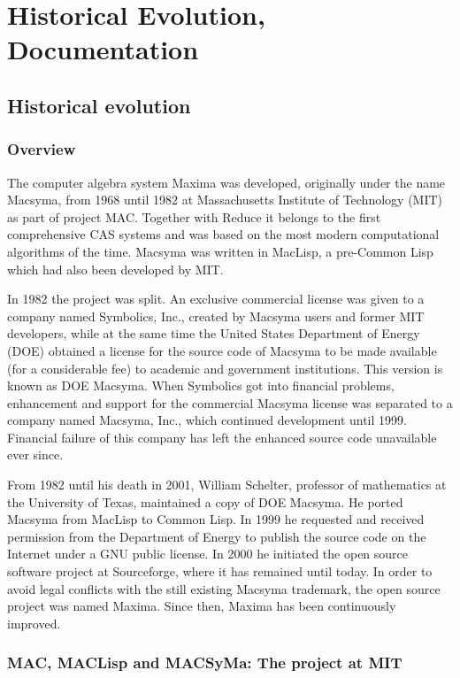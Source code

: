 \documentclass[../Maxima_Workbook.tex]{subfiles}
\begin{document}
	
\part{Historical Evolution, Documentation}

\chapter{Historical evolution}

\section{Overview}

The computer algebra system Maxima was developed, originally under the name Macsyma, from 1968 until 1982 at Massachusetts Institute of Technology (MIT) as part of project MAC. Together with Reduce it belongs to the first comprehensive CAS systems and was based on the most modern computational algorithms of the time. Macsyma was written in MacLisp, a pre-Common Lisp which had also been developed by MIT.

\lz In 1982 the project was split. An exclusive commercial license was given to a company named Symbolics, Inc., created by Macsyma users and former MIT developers, while at the same time the United States Department of Energy (DOE) obtained a license for the source code of Macsyma to be made available (for a considerable fee) to academic and government institutions. This version is known as DOE Macsyma. When Symbolics got into financial problems, enhancement and support for the commercial Macsyma license was separated to a company named Macsyma, Inc., which continued development until 1999. Financial failure of
this company has left the enhanced source code unavailable ever since. 

\lz From 1982 until his death in 2001, William Schelter, professor of mathematics at the University of Texas, maintained a copy of DOE Macsyma. He ported Macsyma from MacLisp to Common Lisp. In 1999 he requested and received permission from the Department of Energy to publish the source code on the Internet under a GNU public license. In 2000 he initiated the open source software project at Sourceforge, where it has remained until today. In order to avoid legal conflicts with the still existing Macsyma trademark, the open source project was named Maxima. Since then, Maxima has been continuously improved.

\section{MAC, MACLisp and MACSyMa: The project at MIT}
\end{document}

